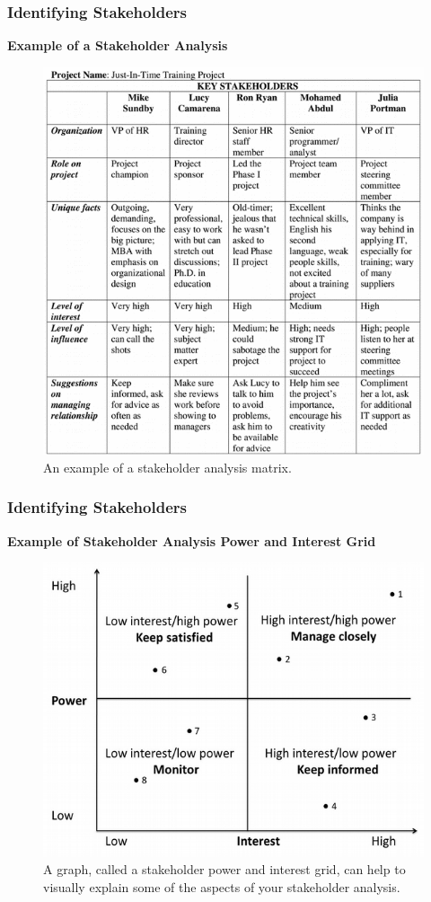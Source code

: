 \documentclass[aspectratio=169]{beamer}
\begin{document}
\begin{frame}
\frametitle{Identifying Stakeholders}
\textbf{Example of a Stakeholder Analysis}
\begin{figure}
\includegraphics[scale=0.35]{stakeholder_analysis}
\caption{An example of a stakeholder analysis matrix.}
\end{figure}
\end{frame}

\begin{frame}
\frametitle{Identifying Stakeholders}
\textbf{Example of Stakeholder Analysis Power and Interest Grid}\\
\begin{figure}
\includegraphics[scale=0.45]{stakeholder_analysis_grid}
\caption{A graph, called a stakeholder power and interest grid, can help to visually explain some of the aspects of your stakeholder analysis.}
\end{figure}
\end{frame}
\end{document}
